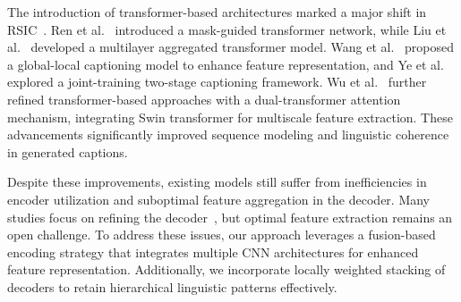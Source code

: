 The introduction of transformer-based architectures marked a major shift in RSIC~\cite{vaswani2017attention}. Ren et al.~\cite{ren2022mask} introduced a mask-guided transformer network, while Liu et al.~\cite{liu2022remote} developed a multilayer aggregated transformer model. Wang et al.~\cite{wang2022glcm} proposed a global-local captioning model to enhance feature representation, and Ye et al.~\cite{ye2022joint} explored a joint-training two-stage captioning framework. Wu et al.~\cite{wu2024trtr} further refined transformer-based approaches with a dual-transformer attention mechanism, integrating Swin transformer for multiscale feature extraction. These advancements significantly improved sequence modeling and linguistic coherence in generated captions.

Despite these improvements, existing models still suffer from inefficiencies in encoder utilization and suboptimal feature aggregation in the decoder. Many studies focus on refining the decoder~\cite{hoxha2020new,hoxha2021novel,das2024textgcn}, but optimal feature extraction remains an open challenge. To address these issues, our approach leverages a fusion-based encoding strategy that integrates multiple CNN architectures for enhanced feature representation. Additionally, we incorporate locally weighted stacking of decoders to retain hierarchical linguistic patterns effectively.